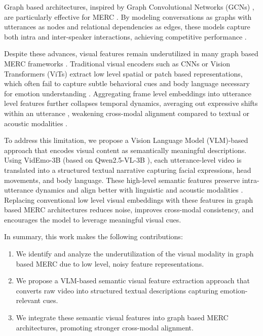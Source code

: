 \documentclass[runningheads]{llncs}
\begin{document}
Graph based architectures, inspired by Graph Convolutional Networks (GCNs) \cite{kipf2017gcn}, are particularly effective for MERC \cite{ghosal2019dialoguegcn,hu2021mmgcn}. By modeling conversations as graphs with utterances as nodes and relational dependencies as edges, these models capture both intra and inter-speaker interactions, achieving competitive performance \cite{hu2021mmgcn}.

Despite these advances, visual features remain underutilized in many graph based MERC frameworks \cite{hu2021mmgcn,li2024graphsmile}. Traditional visual encoders such as CNNs \cite{he2016resnet} or Vision Transformers (ViTs) \cite{dosovitskiy2021vit} extract low level spatial or patch based representations, which often fail to capture subtle behavioral cues and body language necessary for emotion understanding \cite{li2018self}. Aggregating frame level embeddings into utterance level features further collapses temporal dynamics, averaging out expressive shifts within an utterance \cite{tsai2019mult}, weakening cross-modal alignment compared to textual or acoustic modalities \cite{devlin2019bert,schuller2011recognising}.

To address this limitation, we propose a Vision Language Model (VLM)-based approach that encodes visual content as semantically meaningful descriptions. Using VidEmo-3B (based on Qwen2.5-VL-3B \cite{qwen2_5_vl}), each utterance-level video is translated into a structured textual narrative capturing facial expressions, head movements, and body language. These high-level semantic features preserve intra-utterance dynamics and align better with linguistic and acoustic modalities \cite{radford2021clip}. Replacing conventional low level visual embeddings with these features in graph based MERC architectures reduces noise, improves cross-modal consistency, and encourages the model to leverage meaningful visual cues.

In summary, this work makes the following contributions:

\begin{enumerate}
\item We identify and analyze the underutilization of the visual modality in graph based MERC due to low level, noisy feature representations.
\item We propose a VLM-based semantic visual feature extraction approach that converts raw video into structured textual descriptions capturing emotion-relevant cues.
\item We integrate these semantic visual features into graph based MERC architectures, promoting stronger cross-modal alignment.
\end{enumerate}
\end{document}
